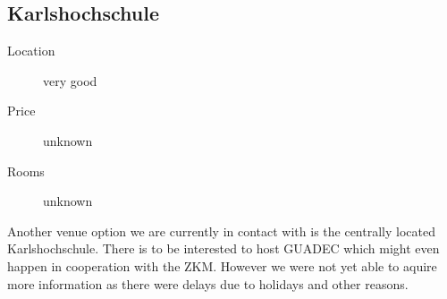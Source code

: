 \subsection{Karlshochschule}
\begin{description}
\item[Location] very good
\item[Price] unknown
\item[Rooms] unknown
\end{description}

Another venue option we are currently in contact with is the centrally
located Karlshochschule. There is to be interested to host GUADEC which
might even happen in cooperation with the ZKM. However we were not yet able
to aquire more information as there were delays due to holidays and other reasons.

